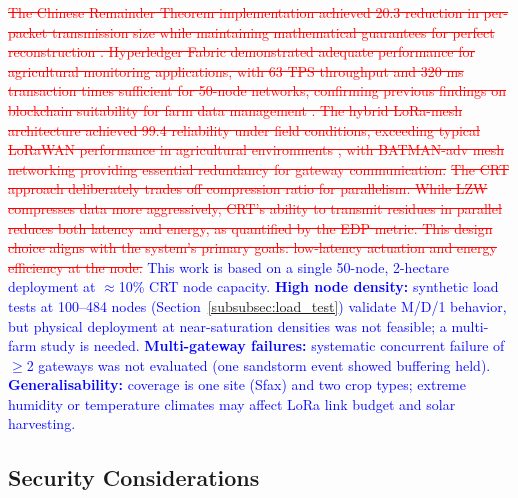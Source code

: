 \documentclass[pdflatex,sn-mathphys-num]{sn-jnl}
\theoremstyle{thmstyleone}
\theoremstyle{thmstyletwo}
\theoremstyle{thmstylethree}
\begin{document}
{\textcolor{red}{\sout{The Chinese Remainder Theorem implementation achieved 20.3 reduction in per-packet transmission size while maintaining mathematical guarantees for perfect reconstruction . Hyperledger Fabric demonstrated adequate performance for agricultural monitoring applications, with 63 TPS throughput and 320 ms transaction times sufficient for 50-node networks, confirming previous findings on blockchain suitability for farm data management . The hybrid LoRa-mesh architecture achieved 99.4 reliability under field conditions, exceeding typical LoRaWAN performance in agricultural environments , with BATMAN-adv mesh networking providing essential redundancy for gateway communication.}}
\textcolor{red}{\sout{The CRT approach deliberately trades off compression ratio for parallelism. While LZW compresses data more aggressively, CRT's ability to transmit residues in parallel reduces both latency and energy, as quantified by the EDP metric. This design choice aligns with the system's primary goals: low‑latency actuation and energy efficiency at the node.}}
\textcolor{blue}{This work is based on a single 50-node, 2-hectare deployment at $\approx$10\% CRT node capacity. \textbf{High node density:} synthetic load tests at 100--484 nodes (Section~\ref{subsubsec:load_test}) validate M/D/1 behavior, but physical deployment at near-saturation densities was not feasible; a multi-farm study is needed. \textbf{Multi-gateway failures:} systematic concurrent failure of $\geq$2 gateways was not evaluated (one sandstorm event showed buffering held). \textbf{Generalisability:} coverage is one site (Sfax) and two crop types; extreme humidity or temperature climates may affect LoRa link budget and solar harvesting.}

\subsection{Security Considerations}
\label{subsec:security}

}
\end{document}
